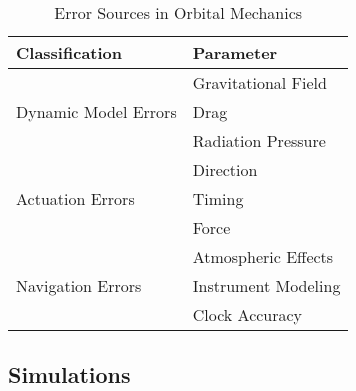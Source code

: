 \begin{table}[h]
\centering
\begin{tabular}{@{}ll@{}}
\toprule
\textbf{Classification}                        & \textbf{Parameter}           \\ \midrule
\multirow{3}{*}{Dynamic Model Errors} & Gravitational Field \\
                                      & Drag                \\
                                      & Radiation Pressure  \\ \midrule
\multirow{3}{*}{Actuation Errors}     & Direction           \\
                                      & Timing              \\
                                      & Force               \\ \midrule
\multirow{3}{*}{Navigation Errors}    & Atmospheric Effects \\
                                      & Instrument Modeling \\
                                      & Clock Accuracy   \\    
\bottomrule
\end{tabular}%
\caption{Error Sources in Orbital Mechanics}
\label{tab:error_sources}
\end{table}
    




\subsection{Simulations}



